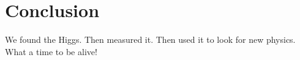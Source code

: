 \chapter{Conclusion}
\label{conclusion}

We found the Higgs. Then measured it. Then used it to look for new physics. What a time to be alive!